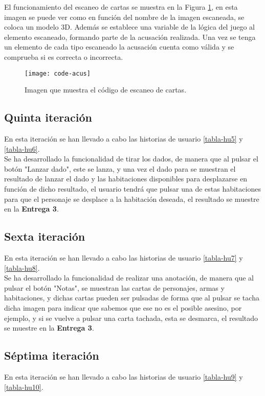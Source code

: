 \newpage

El funcionamiento del escaneo de cartas se muestra en la Figura \ref{figura-code-acus}, en esta imagen se puede ver como en función del nombre de la imagen escaneada, se coloca un modelo 3D. Además se establece una variable de la lógica del juego al elemento escaneado, formando parte de la acusación realizada. Una vez se tenga un elemento de cada tipo escaneado la acusación cuenta como válida y se comprueba si es correcta o incorrecta.

\begin{figure}[h]
  \centering
  \texttt{[image: code-acus]}
  \caption{Imagen que muestra el código de escaneo de cartas.}
  \label{figura-code-acus}
\end{figure}

\subsection{Quinta iteración}
En esta iteración se han llevado a cabo las historias de usuario \ref{tabla-hu5} y \ref{tabla-hu6}.\\

Se ha desarrollado la funcionalidad de tirar los dados, de manera que al pulsar el botón "Lanzar dado", este se lanza, y una vez el dado para se muestran el resultado de lanzar el dado y las habitaciones disponibles para desplazarse en función de dicho resultado, el usuario tendrá que pulsar una de estas habitaciones para que el personaje se desplace a la habitación deseada, el resultado se muestre en la \textbf{Entrega 3}.\\

\subsection{Sexta iteración}
En esta iteración se han llevado a cabo las historias de usuario \ref{tabla-hu7} y \ref{tabla-hu8}.\\

Se ha desarrollado la funcionalidad de realizar una anotación, de manera que al pulsar el botón "Notas", se muestran las cartas de personajes, armas y habitaciones, y dichas cartas pueden ser pulsadas de forma que al pulsar se tacha dicha imagen para indicar que sabemos que ese no es el posible asesino, por ejemplo, y si se vuelve a pulsar una carta tachada, esta se desmarca, el resultado se muestre en la \textbf{Entrega 3}.\\

\subsection{Séptima iteración}
En esta iteración se han llevado a cabo las historias de usuario \ref{tabla-hu9} y \ref{tabla-hu10}.\\

